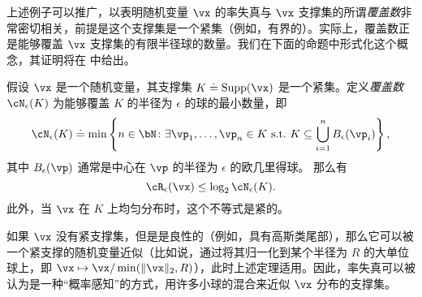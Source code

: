 \documentclass[../../book-main_zh.tex]{subfiles}
\begin{document}
上述例子可以推广，以表明随机变量 \(\vx\) 的率失真与 \(\vx\) 支撑集的所谓\textit{覆盖数}非常密切相关，前提是这个支撑集是一个紧集（例如，有界的）。实际上，覆盖数正是能够覆盖 \(\vx\) 支撑集的有限半径球的数量。我们在下面的命题中形式化这个概念，其证明将在  中给出。

\begin{proposition}\label{prop:covering-number-rate-distortion}
	假设 \(\vx\) 是一个随机变量，其支撑集 \(K \doteq \Supp(\vx)\) 是一个紧集。定义\textit{覆盖数} \(\cN_{\epsilon}(K)\) 为能够覆盖 \(K\) 的半径为 \(\epsilon\) 的球的最小数量，即
	\begin{equation}
		\cN_{\epsilon}(K) \doteq \min\left\{n \in \bN \colon \exists \vp_{1}, \dots, \vp_{n} \in K\ \text{s.t.}\ K \subseteq \bigcup_{i = 1}^{n}B_{\epsilon}(\vp_{i})\right\},
	\end{equation}
	其中 \(B_{\epsilon}(\vp)\) 通常是中心在 \(\vp\) 的半径为 \(\epsilon\) 的欧几里得球。
	那么有
	\begin{equation}
		\cR_{\epsilon}(\vx) \leq \log_{2} \cN_{\epsilon}(K).
	\end{equation}
	此外，当 \(\vx\) 在 \(K\) 上均匀分布时，这个不等式是紧的。
\end{proposition}
如果 \(\vx\) 没有紧支撑集，但是是良性的（例如，具有高斯类尾部），那么它可以被一个紧支撑的随机变量近似（比如说，通过将其归一化到某个半径为 \(R\) 的大单位球上，即 \(\vx \mapsto \vx / \min(\|\vx\|_2, R)\)），此时上述定理适用。因此，率失真可以被认为是一种“概率感知”的方式，用许多小球的混合来近似 \(\vx\) 分布的支撑集。
\end{document}
